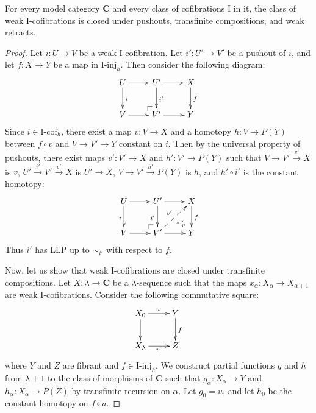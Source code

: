 \documentclass{tac}
\makeatletter
\theoremstyle{definition}
\newcommand{\cat}[1]{\mathbf{#1}}
\newcommand{\C}{\cat{C}}
\newcommand{\I}{\mathrm{I}}
\newcommand{\class}[2]{#1\text{-}\mathrm{#2}}
\newcommand{\Iinj}[1][\I]{\class{#1}{inj}}
\newcommand{\Icof}[1][\I]{\class{#1}{cof}}
\newcommand{\po}[1][dr]{\save*!/#1+1.2pc/#1:(1,-1)@^{|-}\restore}
\makeatother
\begin{document}
\begin{prop}
For every model category $\C$ and every class of cofibrations $\I$ in it,
the class of weak $\I$-cofibrations is closed under pushouts, transfinite compositions, and weak retracts.
\end{prop}
\begin{proof}
Let $i : U \to V$ be a weak $\I$-cofibration.
Let $i' : U' \to V'$ be a pushout of $i$, and let $f : X \to Y$ be a map in $\Iinj_h$.
Then consider the following diagram:
\[ \xymatrix{ U \ar[r] \ar[d]^i &     U' \ar[r] \ar[d]^{i'} & X \ar[d]^f \\
              V \ar[r]          & \po V' \ar[r]             & Y
            } \]
Since $i \in \Icof_h$, there exist a map $v : V \to X$ and a homotopy $h : V \to P(Y)$ between $f \circ v$ and $V \to V' \to Y$ constant on $i$.
Then by the universal property of pushouts, there exist maps $v' : V' \to X$ and $h' : V' \to P(Y)$ such that $V \to V' \xrightarrow{v'} X$ is $v$,
$U' \xrightarrow{i'} V' \xrightarrow{v'} X$ is $U' \to X$, $V \to V' \xrightarrow{h'} P(Y)$ is $h$, and $h' \circ i'$ is the constant homotopy:
\[ \xymatrix{ U \ar[r] \ar[d]_i &     U' \ar[r] \ar[d]_{i'} \ar@{}[dr]|(.7){\sim^r_{i'}} & X \ar[d]^f \\
              V \ar[r]          & \po V' \ar[r] \ar@{-->}[ur]^{v'}                       & Y
            } \]
Thus $i'$ has LLP up to $\sim_{i'}$ with respect to $f$.

Now, let us show that weak $\I$-cofibrations are closed under transfinite compositions.
Let $X : \lambda \to \C$ be a $\lambda$-sequence such that the maps $x_\alpha : X_\alpha \to X_{\alpha+1}$ are weak $\I$-cofibrations.
Consider the following commutative square:
\[ \xymatrix{ X_0 \ar[r]^u \ar[d] & Y \ar[d]^f \\
              X_\lambda \ar[r]_v & Z
            } \]
where $Y$ and $Z$ are fibrant and $f \in \Iinj_h$.
We construct partial functions $g$ and $h$ from $\lambda+1$ to the class of morphisms of $\C$
such that $g_\alpha : X_\alpha \to Y$ and $h_\alpha : X_\alpha \to P(Z)$ by transfinite recursion on $\alpha$.
Let $g_0 = u$, and let $h_0$ be the constant homotopy on $f \circ u$.


\end{proof}
\end{document}
